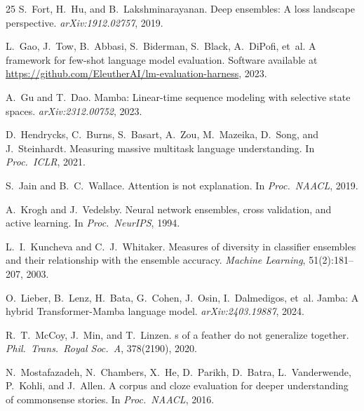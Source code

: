 \documentclass[11pt,twocolumn]{article}
\begin{document}
\begin{thebibliography}{25}
S.~Fort, H.~Hu, and B.~Lakshminarayanan.
\newblock Deep ensembles: A loss landscape perspective.
\newblock \emph{arXiv:1912.02757}, 2019.

L.~Gao, J.~Tow, B.~Abbasi, S.~Biderman, S.~Black, A.~DiPofi, et~al.
\newblock A framework for few-shot language model evaluation.
\newblock Software available at \url{https://github.com/EleutherAI/lm-evaluation-harness}, 2023.

A.~Gu and T.~Dao.
\newblock Mamba: Linear-time sequence modeling with selective state spaces.
\newblock \emph{arXiv:2312.00752}, 2023.

D.~Hendrycks, C.~Burns, S.~Basart, A.~Zou, M.~Mazeika, D.~Song, and J.~Steinhardt.
\newblock Measuring massive multitask language understanding.
\newblock In \emph{Proc.\ ICLR}, 2021.

S.~Jain and B.~C.~Wallace.
\newblock Attention is not explanation.
\newblock In \emph{Proc.\ NAACL}, 2019.

A.~Krogh and J.~Vedelsby.
\newblock Neural network ensembles, cross validation, and active learning.
\newblock In \emph{Proc.\ NeurIPS}, 1994.

L.~I.~Kuncheva and C.~J.~Whitaker.
\newblock Measures of diversity in classifier ensembles and their relationship with the ensemble accuracy.
\newblock \emph{Machine Learning}, 51(2):181--207, 2003.

O.~Lieber, B.~Lenz, H.~Bata, G.~Cohen, J.~Osin, I.~Dalmedigos, et~al.
\newblock Jamba: A hybrid {T}ransformer-{M}amba language model.
\newblock \emph{arXiv:2403.19887}, 2024.

R.~T.~McCoy, J.~Min, and T.~Linzen.
s of a feather do not generalize together.
\newblock \emph{Phil.\ Trans.\ Royal Soc.\ A}, 378(2190), 2020.

N.~Mostafazadeh, N.~Chambers, X.~He, D.~Parikh, D.~Batra, L.~Vanderwende, P.~Kohli, and J.~Allen.
\newblock A corpus and cloze evaluation for deeper understanding of commonsense stories.
\newblock In \emph{Proc.\ NAACL}, 2016.


\end{thebibliography}
\end{document}
